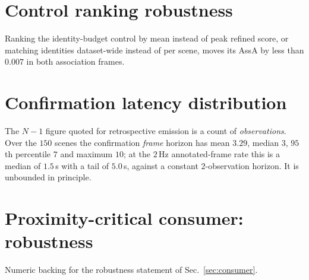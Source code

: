 \section{Control ranking robustness}
\label{supp:ranking}
Ranking the identity-budget control by mean instead of peak refined score, or
matching identities dataset-wide instead of per scene, moves its AssA by less
than $0.007$ in both association frames.

\section{Confirmation latency distribution}
\label{supp:latency}
The $N{-}1$ figure quoted for retrospective emission is a count of
\emph{observations}. Over the $150$ scenes the confirmation \emph{frame}
horizon has mean $3.29$, median $3$, $95$th percentile $7$ and maximum $10$;
at the $2$\,Hz annotated-frame rate this is a median of $1.5$\,s with a tail of
$5.0$\,s, against a constant $2$-observation horizon. It is unbounded in
principle.

\section{Proximity-critical consumer: robustness}
\label{supp:consumer}
Numeric backing for the robustness statement of Sec.~\ref{sec:consumer}.

